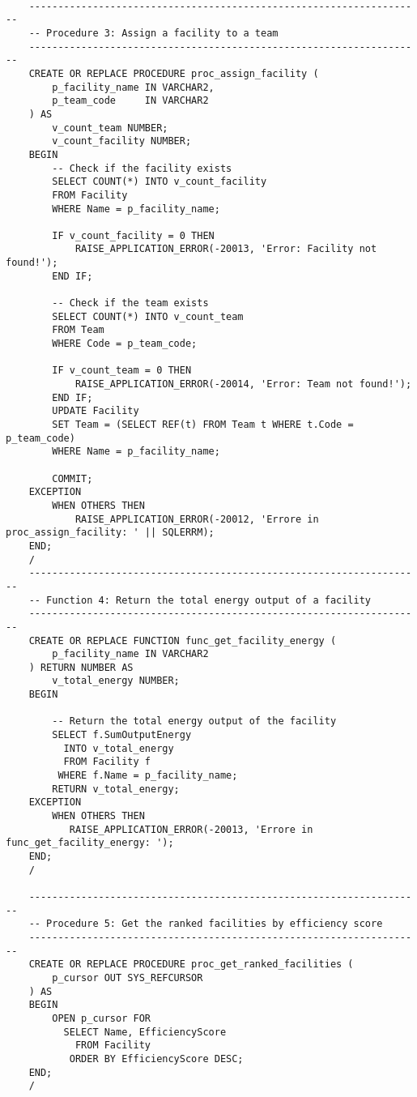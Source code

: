 \begin{lstlisting}
    
    --------------------------------------------------------------------
    -- Procedure 3: Assign a facility to a team
    --------------------------------------------------------------------
    CREATE OR REPLACE PROCEDURE proc_assign_facility (
        p_facility_name IN VARCHAR2,
        p_team_code     IN VARCHAR2
    ) AS
        v_count_team NUMBER;
        v_count_facility NUMBER;
    BEGIN
        -- Check if the facility exists
        SELECT COUNT(*) INTO v_count_facility
        FROM Facility
        WHERE Name = p_facility_name;
    
        IF v_count_facility = 0 THEN
            RAISE_APPLICATION_ERROR(-20013, 'Error: Facility not found!');
        END IF;
    
        -- Check if the team exists
        SELECT COUNT(*) INTO v_count_team
        FROM Team
        WHERE Code = p_team_code;
    
        IF v_count_team = 0 THEN
            RAISE_APPLICATION_ERROR(-20014, 'Error: Team not found!');
        END IF;
        UPDATE Facility
        SET Team = (SELECT REF(t) FROM Team t WHERE t.Code = p_team_code)
        WHERE Name = p_facility_name;
    
        COMMIT;
    EXCEPTION
        WHEN OTHERS THEN
            RAISE_APPLICATION_ERROR(-20012, 'Errore in proc_assign_facility: ' || SQLERRM);
    END;
    /
    --------------------------------------------------------------------
    -- Function 4: Return the total energy output of a facility
    --------------------------------------------------------------------
    CREATE OR REPLACE FUNCTION func_get_facility_energy (
        p_facility_name IN VARCHAR2
    ) RETURN NUMBER AS
        v_total_energy NUMBER;
    BEGIN
         
        -- Return the total energy output of the facility
        SELECT f.SumOutputEnergy
          INTO v_total_energy
          FROM Facility f
         WHERE f.Name = p_facility_name;
        RETURN v_total_energy;
    EXCEPTION
        WHEN OTHERS THEN
           RAISE_APPLICATION_ERROR(-20013, 'Errore in func_get_facility_energy: ');
    END;
    /
    
    --------------------------------------------------------------------
    -- Procedure 5: Get the ranked facilities by efficiency score
    --------------------------------------------------------------------
    CREATE OR REPLACE PROCEDURE proc_get_ranked_facilities (
        p_cursor OUT SYS_REFCURSOR
    ) AS
    BEGIN
        OPEN p_cursor FOR
          SELECT Name, EfficiencyScore
            FROM Facility
           ORDER BY EfficiencyScore DESC;
    END;
    /
\end{lstlisting}